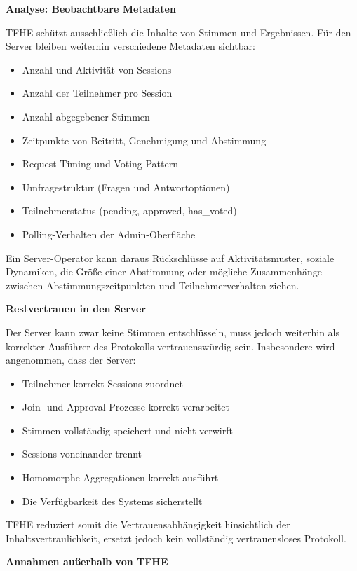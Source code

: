 \textbf{Analyse: Beobachtbare Metadaten}

TFHE schützt ausschließlich die Inhalte von Stimmen und Ergebnissen. Für den Server bleiben weiterhin verschiedene Metadaten sichtbar:

\begin{itemize}
    \item Anzahl und Aktivität von Sessions
    \item Anzahl der Teilnehmer pro Session
    \item Anzahl abgegebener Stimmen
    \item Zeitpunkte von Beitritt, Genehmigung und Abstimmung
    \item Request-Timing und Voting-Pattern
    \item Umfragestruktur (Fragen und Antwortoptionen)
    \item Teilnehmerstatus (pending, approved, has\_voted)
    \item Polling-Verhalten der Admin-Oberfläche
\end{itemize}

Ein Server-Operator kann daraus Rückschlüsse auf Aktivitätsmuster, soziale Dynamiken, die Größe einer Abstimmung oder mögliche Zusammenhänge zwischen Abstimmungszeitpunkten und Teilnehmerverhalten ziehen. 

\textbf{Restvertrauen in den Server}

Der Server kann zwar keine Stimmen entschlüsseln, muss jedoch weiterhin als korrekter Ausführer des Protokolls vertrauenswürdig sein. Insbesondere wird angenommen, dass der Server:

\begin{itemize}
    \item Teilnehmer korrekt Sessions zuordnet
    \item Join- und Approval-Prozesse korrekt verarbeitet
    \item Stimmen vollständig speichert und nicht verwirft
    \item Sessions voneinander trennt
    \item Homomorphe Aggregationen korrekt ausführt
    \item Die Verfügbarkeit des Systems sicherstellt
\end{itemize}

TFHE reduziert somit die Vertrauensabhängigkeit hinsichtlich der Inhaltsvertraulichkeit, ersetzt jedoch kein vollständig vertrauensloses Protokoll.

\textbf{Annahmen außerhalb von TFHE}


